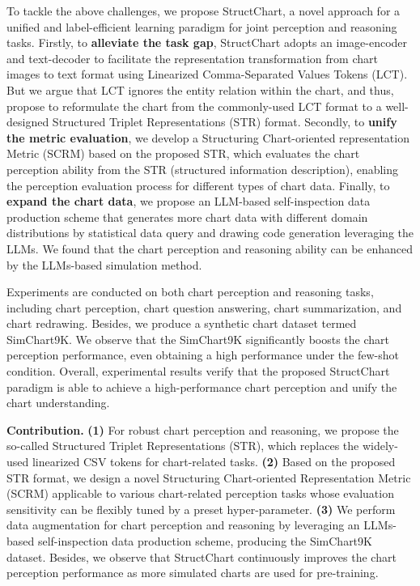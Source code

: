 \documentclass{article} \usepackage{iclr2024_conference,times}
\begin{document}
To tackle the above challenges, we propose StructChart, a novel approach for a unified and label-efficient learning paradigm for joint perception and reasoning tasks. Firstly, to \textbf{alleviate the task gap}, StructChart adopts an image-encoder and text-decoder to facilitate the representation transformation from chart images to text format using Linearized Comma-Separated Values Tokens (LCT). But we argue that LCT ignores the entity relation within the chart, and thus, propose to reformulate the chart from the commonly-used LCT format to a well-designed Structured Triplet Representations (STR) format. Secondly, to \textbf{unify the metric evaluation}, we develop a Structuring Chart-oriented representation Metric (SCRM) based on the proposed STR, which evaluates the chart perception ability from the STR (structured information description), enabling the perception evaluation process for different types of chart data. Finally, to \textbf{expand the chart data}, we propose an LLM-based self-inspection data production scheme that generates more chart data with different domain distributions by statistical data query and drawing code generation leveraging the LLMs. We found that the chart perception and reasoning ability can be enhanced by the LLMs-based simulation method.

Experiments are conducted on both chart perception and reasoning tasks, including chart perception, chart question answering, chart summarization, and chart redrawing. Besides, we produce a synthetic chart dataset termed SimChart9K. We observe that the SimChart9K significantly boosts the chart perception performance, even obtaining a high performance under the few-shot condition. Overall, experimental results verify that the proposed StructChart paradigm is able to achieve a high-performance chart perception and unify the chart understanding.

\textbf{Contribution.} \textbf{(1)} For robust chart perception and reasoning, we propose the so-called Structured Triplet Representations (STR), which replaces the widely-used linearized CSV tokens for chart-related tasks. \textbf{(2)} Based on the proposed STR format, we design a novel Structuring Chart-oriented Representation Metric (SCRM) applicable to various chart-related perception tasks whose evaluation sensitivity can be flexibly tuned by a preset hyper-parameter. \textbf{(3)} We perform data augmentation for chart perception and reasoning by leveraging an LLMs-based self-inspection data production scheme, producing the SimChart9K dataset. Besides, we observe that StructChart continuously improves the chart perception performance as more simulated charts are used for pre-training.
\end{document}
